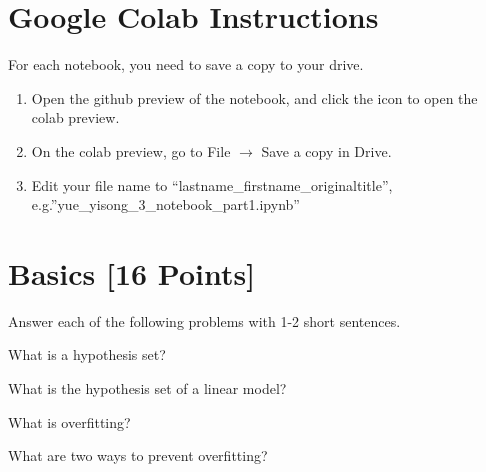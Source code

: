\section*{Google Colab Instructions}

For each notebook, you need to save a copy to your drive.

\begin{enumerate}
	\item Open the github preview of the notebook, and click the icon to open the colab preview.
	\item On the colab preview, go to File $\rightarrow$ Save a copy in Drive.
	\item Edit your file name to “lastname_firstname_originaltitle”, e.g.”yue_yisong_3_notebook_part1.ipynb”
\end{enumerate}


\newpage
\section{Basics [16 Points]}

Answer each of the following problems with 1-2 short sentences.

\begin{problem}[2]
  What is a hypothesis set?
\end{problem}
\begin{solution}
  
\end{solution}

\begin{problem}[2]
  What is the hypothesis set of a linear model?
\end{problem}
\begin{solution}
  
\end{solution}

\begin{problem}[2]
  What is overfitting?
\end{problem}
\begin{solution}
  
\end{solution}

\begin{problem}[2]
  What are two ways to prevent overfitting?
\end{problem}
\begin{solution}
  
\end{solution}

